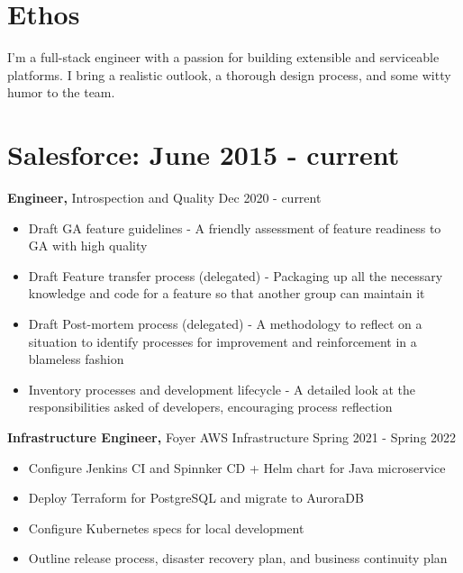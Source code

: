 \documentclass[12pt]{res}
\begin{document}

\address{{\bf Contact Information} \\ (720) 219-7914 \\ gik0geck0@gmail.com}
\address{{\bf Open Source} \\ https://github.com/gik0geck0 }

\begin{resume}

\section{Ethos}

I'm a full-stack engineer with a passion for building extensible and serviceable platforms. I bring a realistic outlook, a thorough design process, and some witty humor to the team.

\section{Salesforce: June 2015 - current}

{\bf Engineer,} Introspection and Quality \hfill Dec 2020 - current
\begin{itemize} \itemsep -2pt
    \item Draft GA feature guidelines - A friendly assessment of feature readiness to GA with high quality
    \item Draft Feature transfer process (delegated) - Packaging up all the necessary knowledge and code for a feature so that another group can maintain it
    \item Draft Post-mortem process (delegated) - A methodology to reflect on a situation to identify processes for improvement and reinforcement in a blameless fashion
    \item Inventory processes and development lifecycle - A detailed look at the responsibilities asked of developers, encouraging process reflection
\end{itemize}

{\bf Infrastructure Engineer,} Foyer AWS Infrastructure \hfill Spring 2021 - Spring 2022
\begin{itemize} \itemsep -2pt
    \item Configure Jenkins CI and Spinnker CD + Helm chart for Java microservice
    \item Deploy Terraform for PostgreSQL and migrate to AuroraDB
    \item Configure Kubernetes specs for local development
    \item Outline release process, disaster recovery plan, and business continuity plan
\end{itemize}


\end{resume}
\end{document}
